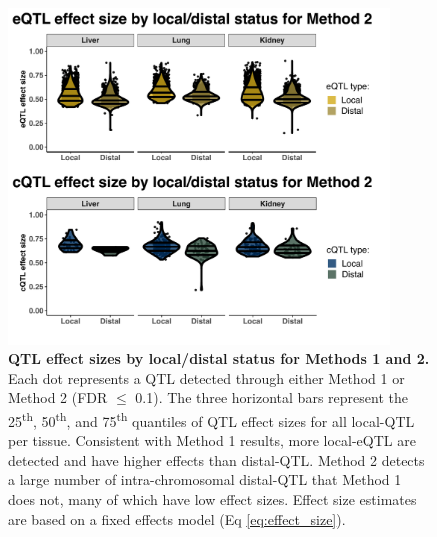 \documentclass[9pt,twocolumn,twoside]{gsajnl}
\begin{document}
\begin{figure}[h]
\centering
\includegraphics[width=0.9\textwidth, trim={0in 0.25in 0in 0in}, clip]{figs/qtl_effect_sizes_permissive.pdf}
\caption{\textbf{QTL effect sizes by local/distal status for Methods 1 and 2.} Each dot represents a QTL detected through either Method 1 or Method 2 (FDR $\leq$ 0.1). The three horizontal bars represent the 25\textsuperscript{th}, 50\textsuperscript{th}, and 75\textsuperscript{th} quantiles of QTL effect sizes for all local-QTL per tissue. Consistent with Method 1 results, more local-eQTL are detected and have higher effects than distal-QTL. Method 2 detects a large number of intra-chromosomal distal-QTL that Method 1 does not, many of which have low effect sizes. Effect size estimates are based on a fixed effects model (Eq \ref{eq:effect_size}).
\label{fig:qtl_effect_sizes_permissive}}
\end{figure}
\end{document}

